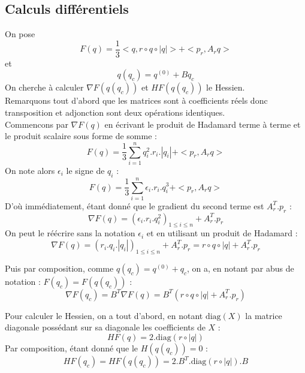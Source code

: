 \documentclass{article}
\begin{document}
    \subsection{Calculs différentiels}
        On pose \[ F(q) = \frac{1}{3}<q, r \circ q \circ |q|> + <p_r, A_rq> \] et \[q(q_c) = q^{(0)} + Bq_c \]
        On cherche à calculer $\nabla F(q(q_c))$ et $H F(q(q_c))$ le Hessien.\\
        Remarquons tout d'abord que les matrices sont à coefficients réels donc transposition et adjonction sont deux opérations identiques.\\
        Commencons par $\nabla F(q)$ en écrivant le produit de Hadamard terme à terme et le produit scalaire sous forme de somme :
        \[ F(q) = \frac{1}{3}\sum_{i = 1}^n q_i^2.r_i.|q_i| + <p_r, A_rq>\]
        On note alors $\epsilon_i$ le signe de $q_i$ :
        \[ F(q) = \frac{1}{3}\sum_{i = 1}^n \epsilon_i.r_i.q_i^3 + <p_r, A_rq>\]
        D'où immédiatement, étant donné que le gradient du second terme est $A_r^T.p_r$ :
        \[\nabla F(q) = (\epsilon_i.r_i.q_i^2)_{1 \leq i \leq n} + A_r^T.p_r\]
        On peut le réécrire sans la notation $\epsilon_i$ et en utilisant un produit de Hadamard : 
        \[ \boxed{\nabla F(q) = (r_i.q_i.|q_i|)_{1 \leq i \leq n} + A_r^T.p_r
            = r\circ q \circ |q| + A_r^T.p_r}\]

        Puis par composition, comme $q(q_c) = q^{(0)} + q_c$, on a, en notant par abus de notation : $F(q_c) = F(q(q_c))$ :
        \[ \boxed{\nabla F(q_c) = B^T\nabla F(q) = B^T(r\circ q \circ |q| + A_r^T.p_r)  
        }\]

        Pour calculer le Hessien, on a tout d'abord, en notant $\text{diag}(X)$ la matrice diagonale possédant sur sa diagonale les coefficients de $X$ :
        \[H F(q) = 2.\text{diag}(r\circ|q|)\]
        Par composition, étant donné que le $H(q(q_c)) = 0$ :
        \[ \boxed{H F(q_c) = H F(q(q_c)) = 2.B^T.\text{diag}(r\circ|q|).B}
        \] 

    \paragraph{}
\section{}



\end{document}
